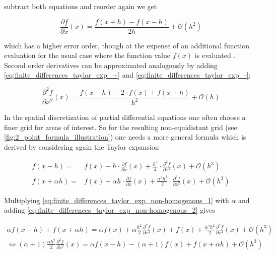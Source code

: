 \documentclass{scrartcl}[12pt, halfparskip]
\numberwithin{equation}{section}
\numberwithin{figure}{section}
\numberwithin{table}{section}
\begin{document}
subtract both equations and reorder again we get

\begin{equation}
\frac{\partial f}{\partial x}(x) = \frac{f(x+h) - f(x-h)}{2 h} + \mathcal{O}(h^2)
\end{equation}

which has a higher error order, though at the expense of an additional function evaluation for the usual case where the function value $f(x)$ is evaluated . \\

Second order derivatives can be approximated analogously by adding \cref{eq:finite_differences_taylor_exp_+} and \cref{eq:finite_differences_taylor_exp_-}:

\begin{equation}
\frac{\partial^2 f}{\partial x^2}(x) = \frac{f(x-h) - 2 \cdot f(x) + f(x+h)}{h^2} + \mathcal{O}(h)
\label{eq:finite_difference_2nd_der}
\end{equation}

In the spatial discretization of partial differential equations one often choose a finer grid for areas of interest. So for the resulting non-equidistant grid (see \cref{fig:2_point_formula_illustration}) one needs a more general formula which is derived by considering again the Taylor expansion

\begin{subequations}
	\label{eq:finite_differences_taylor_exp_non-homogenous}
	\begin{align}
	f(x-h) = & f(x) - h \cdot \frac{\partial f}{\partial x}(x) + \frac{h^2}{2} \cdot \frac{\partial^2 f}{\partial x^2}(x) + \mathcal{O}(h^3) \label{eq:finite_differences_taylor_exp_non-homogenous_1} \\
	f(x+\alpha h) = & f(x) + \alpha h \cdot \frac{\partial f}{\partial x}(x) + \frac{\alpha^2 h^2}{2} \cdot \frac{\partial^2 f}{\partial x^2}(x) + \mathcal{O}(h^3)  \label{eq:finite_differences_taylor_exp_non-homogenous_2}
	\end{align}
\end{subequations}



Multiplying \cref{eq:finite_differences_taylor_exp_non-homogenous_1} with $\alpha$ and adding \cref{eq:finite_differences_taylor_exp_non-homogenous_2} gives

\begin{align}
\alpha f(x-h) + f(x+\alpha h) = \alpha f(x) + \alpha \frac{h^2}{2} \frac{\partial^2 f}{\partial x^2}(x) + f(x) + \frac{\alpha^2 h^2}{2} \frac{\partial^2 f}{\partial x^2}(x) + \mathcal{O}(h^3)  \\
\Leftrightarrow (\alpha+1) \frac{\alpha h^2}{2} \frac{\partial^2 f}{\partial x^2}(x) = \alpha f(x-h) - (\alpha+1) f(x) + f(x+\alpha h) + \mathcal{O}(h^3) 
\end{align}
\end{document}
